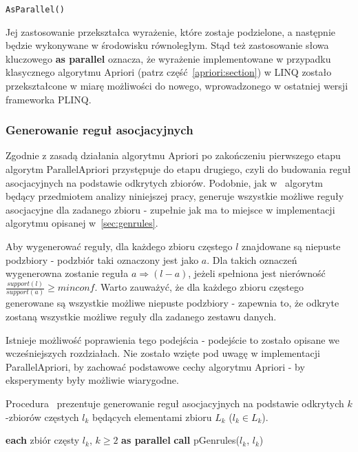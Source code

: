 \begin{verbatim}
AsParallel()
\end{verbatim}

Jej zastosowanie przekształca wyrażenie, które zostaje podzielone, a następnie będzie wykonywane w środowisku równoległym. Stąd też zastosowanie słowa kluczowego \textbf{as parallel} oznacza, że wyrażenie implementowane w przypadku klasycznego algorytmu Apriori (patrz część~\ref{apriori:section}) w LINQ zostało przekształcone w miarę możliwości do nowego, wprowadzonego w ostatniej wersji frameworka PLINQ.

\subsubsection{Generowanie reguł asocjacyjnych}
Zgodnie z zasadą działania algorytmu Apriori po zakończeniu pierwszego etapu algorytm ParallelApriori przystępuje do etapu drugiego, czyli do budowania reguł asocjacyjnych na podstawie odkrytych zbiorów. Podobnie, jak w~\cite{Apriori:Main} algorytm będący przedmiotem analizy niniejszej pracy, generuje wszystkie możliwe reguły asocjacyjne dla zadanego zbioru - zupełnie jak ma to miejsce w implementacji algorytmu opisanej w~\ref{sec:genrules}.

Aby wygenerować reguły, dla każdego zbioru częstego $l$ znajdowane są niepuste podzbiory - podzbiór taki oznaczony jest jako $a$. Dla takich oznaczeń wygenerowna zostanie reguła $a \Rightarrow (l-a)$, jeżeli spełniona jest nierówność $\frac{support(l)}{support(a)} \geq minconf$. Warto zauważyć, że dla każdego zbioru częstego generowane są wszystkie możliwe niepuste podzbiory - zapewnia to, że odkryte zostaną wszystkie możliwe reguły dla zadanego zestawu danych.

Istnieje możliwość poprawienia tego podejścia - podejście to zostało opisane we wcześniejszych rozdziałach. Nie zostało wzięte pod uwagę w implementacji ParallelApriori, by zachować podstawowe cechy algorytmu Apriori - by eksperymenty były możliwie wiarygodne.

Procedura~ prezentuje generowanie reguł asocjacyjnych na podstawie odkrytych $k$-zbiorów częstych $l_k$ będących elementami zbioru $L_k$ ($l_k \in L_k$).

\begin{codebox}
		\li \For \textbf{each} zbiór częsty $l_k$, $k \geq 2$  \textbf{as parallel}
		\li \Do
			\textbf{call} pGenrules($l_k$, $l_k$)
			\End
		\End
\end{codebox}

